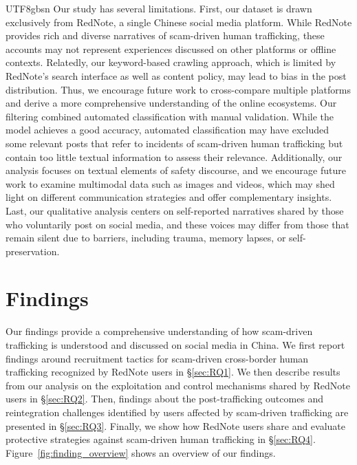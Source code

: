 \documentclass[sigconf,nonacm]{acmart}
\newcommand{\rev}[1]{#1}
\begin{document}
\begin{CJK}{UTF8}{gbsn}
Our study has several limitations. First, our dataset is drawn exclusively from RedNote, a single Chinese social media platform. While RedNote provides rich and diverse narratives of scam-driven human trafficking, these accounts may not represent experiences discussed on other platforms or offline contexts. Relatedly, our keyword-based crawling approach\rev{, which is limited by RedNote's search interface as well as content policy, may lead to bias in the post distribution. Thus, we encourage future work to cross-compare multiple platforms and derive a more comprehensive understanding of the online ecosystems.} \rev{Our filtering combined automated classification with manual validation. While the model achieves a good accuracy, automated classification may have excluded some relevant posts that refer to incidents of scam-driven human trafficking but contain too little textual information to assess their relevance. Additionally, our analysis focuses on textual elements of safety discourse, and we encourage future work to examine multimodal data such as images and videos, which may shed light on different communication strategies and offer complementary insights.} \rev{Last,} our qualitative analysis centers on self-reported narratives shared by those who voluntarily post on social media, and these voices may differ from those that remain silent due to barriers, including trauma, memory lapses, or self-preservation.

\section{Findings}
\label{sec:findings}

Our findings provide a comprehensive understanding of how scam-driven trafficking is understood and discussed on social media in China. We first report findings around recruitment tactics for scam-driven cross-border human trafficking recognized by RedNote users in \S\ref{sec:RQ1}. We then describe results from our analysis on the exploitation and control mechanisms shared by RedNote users in \S\ref{sec:RQ2}. Then, findings about the post-trafficking outcomes and reintegration challenges identified by users affected by scam-driven trafficking are presented in \S\ref{sec:RQ3}. Finally, we show how RedNote users share and evaluate protective strategies against scam-driven human trafficking in \S\ref{sec:RQ4}. Figure~\ref{fig:finding_overview} shows an overview of our findings.



\end{CJK}
\end{document}
